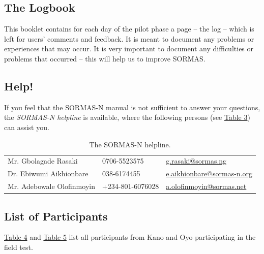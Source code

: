 \documentclass[a4paper, titlepage]{tufte-handout}
\begin{document}
\subsection{The Logbook}
\label{sec-1-5}

This booklet contains for each day of the pilot phase a page -- the log -- which is left for users’ comments and feedback. It is meant to document any problems or experiences that may occur. It is very important to document any difficulties or problems that occurred – this will help us to improve SORMAS.


\subsection{Help!}
\label{sec-1-6}

If you feel that the SORMAS-N manual is not sufficient to answer your questions, the \emph{SORMAS-N helpline} is available, where the following persons (see \hyperref[tab:help]{Table 3}) can assist you.

\begin{table}[htb]
\caption{\label{tab:help}The SORMAS-N helpline.}
\begin{tabular}{l|l|l}
\toprule
Mr. Gbolagade Rasaki & 0706-5523575 & \href{mailto:g.rasaki@sormas.ng}{g.rasaki@sormas.ng}\\
Dr. Ebiwumi Aikhionbare & 038-6174455 & \href{mailto:e.aikhionbare@sormas-n.org}{e.aikhionbare@sormas-n.org}\\
Mr. Adebowale Olofinmoyin & +234-801-6076028 & \href{mailto:a.olofinmoyin@sormas.net}{a.olofinmoyin@sormas.net}\\
\bottomrule
\end{tabular}
\end{table}

\subsection{List of Participants}
\label{sec-1-7}

\hyperref[tab:user-kano]{Table 4} and \hyperref[tab:user-oyo]{Table 5} list all participants from Kano and Oyo participating in the field test.
\end{document}

